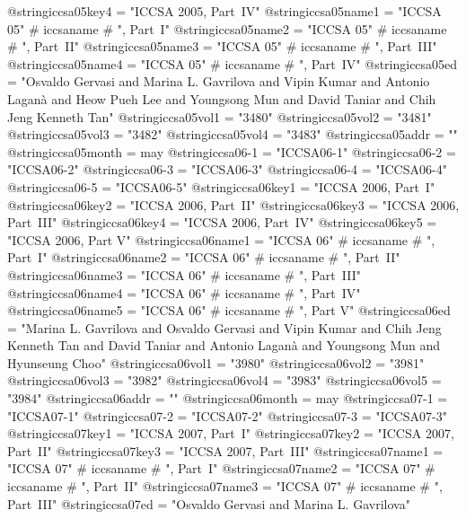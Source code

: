 @string{iccsa05key4 =           "ICCSA 2005, Part~IV"}
@string{iccsa05name1 =          "ICCSA 05" # iccsaname # ", Part~I"}
@string{iccsa05name2 =          "ICCSA 05" # iccsaname # ", Part~II"}
@string{iccsa05name3 =          "ICCSA 05" # iccsaname # ", Part~III"}
@string{iccsa05name4 =          "ICCSA 05" # iccsaname # ", Part~IV"}
@string{iccsa05ed =             "Osvaldo Gervasi and Marina L. Gavrilova and Vipin Kumar and Antonio Lagan{\`a} and Heow Pueh Lee and Youngsong Mun and David Taniar and Chih Jeng Kenneth Tan"}
@string{iccsa05vol1 =           "3480"}
@string{iccsa05vol2 =           "3481"}
@string{iccsa05vol3 =           "3482"}
@string{iccsa05vol4 =           "3483"}
@string{iccsa05addr =           ""}
@string{iccsa05month =          may}
@string{iccsa06-1 =             "ICCSA06-1"}
@string{iccsa06-2 =             "ICCSA06-2"}
@string{iccsa06-3 =             "ICCSA06-3"}
@string{iccsa06-4 =             "ICCSA06-4"}
@string{iccsa06-5 =             "ICCSA06-5"}
@string{iccsa06key1 =           "ICCSA 2006, Part~I"}
@string{iccsa06key2 =           "ICCSA 2006, Part~II"}
@string{iccsa06key3 =           "ICCSA 2006, Part~III"}
@string{iccsa06key4 =           "ICCSA 2006, Part~IV"}
@string{iccsa06key5 =           "ICCSA 2006, Part V"}
@string{iccsa06name1 =          "ICCSA 06" # iccsaname # ", Part~I"}
@string{iccsa06name2 =          "ICCSA 06" # iccsaname # ", Part~II"}
@string{iccsa06name3 =          "ICCSA 06" # iccsaname # ", Part~III"}
@string{iccsa06name4 =          "ICCSA 06" # iccsaname # ", Part~IV"}
@string{iccsa06name5 =          "ICCSA 06" # iccsaname # ", Part V"}
@string{iccsa06ed =             "Marina L. Gavrilova and Osvaldo Gervasi and Vipin Kumar and Chih Jeng Kenneth Tan and David Taniar and Antonio Lagan{\`a} and Youngsong Mun and Hyunseung Choo"}
@string{iccsa06vol1 =           "3980"}
@string{iccsa06vol2 =           "3981"}
@string{iccsa06vol3 =           "3982"}
@string{iccsa06vol4 =           "3983"}
@string{iccsa06vol5 =           "3984"}
@string{iccsa06addr =           ""}
@string{iccsa06month =          may}
@string{iccsa07-1 =             "ICCSA07-1"}
@string{iccsa07-2 =             "ICCSA07-2"}
@string{iccsa07-3 =             "ICCSA07-3"}
@string{iccsa07key1 =           "ICCSA 2007, Part~I"}
@string{iccsa07key2 =           "ICCSA 2007, Part~II"}
@string{iccsa07key3 =           "ICCSA 2007, Part~III"}
@string{iccsa07name1 =          "ICCSA 07" # iccsaname # ", Part~I"}
@string{iccsa07name2 =          "ICCSA 07" # iccsaname # ", Part~II"}
@string{iccsa07name3 =          "ICCSA 07" # iccsaname # ", Part~III"}
@string{iccsa07ed =             "Osvaldo Gervasi and Marina L. Gavrilova"}
